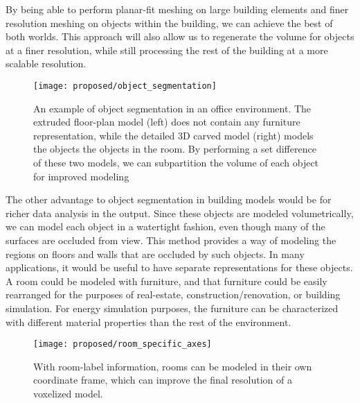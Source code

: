 \documentclass[journal]{IEEEtran}
\begin{document}
By being able to perform planar-fit meshing on large building elements and finer resolution meshing on objects within the building, we can achieve the best of both worlds.  This approach will also allow us to regenerate the volume for objects at a finer resolution, while still processing the rest of the building at a more scalable resolution.

\begin{figure}[t]
	\centerline{\texttt{[image: proposed/object\_segmentation]}}
	\caption{An example of object segmentation in an office environment.  The extruded floor-plan model (left) does not contain any furniture representation, while the detailed 3D carved model (right) models the objects the objects in the room.  By performing a set difference of these two models, we can subpartition the volume of each object for improved modeling}
	\label{fig:objectseg}
\end{figure}

The other advantage to object segmentation in building models would be for richer data analysis in the output.  Since these objects are modeled volumetrically, we can model each object in a watertight fashion, even though many of the surfaces are occluded from view.  This method provides a way of modeling the regions on floors and walls that are occluded by such objects.  In many applications, it would be useful to have separate representations for these objects.  A room could be modeled with furniture, and that furniture could be easily rearranged for the purposes of real-estate, construction/renovation, or building simulation.  For energy simulation purposes, the furniture can be characterized with different material properties than the rest of the environment.

\begin{figure}[t]
	\centerline{\texttt{[image: proposed/room\_specific\_axes]}}
	\caption{With room-label information, rooms can be modeled in their own coordinate frame, which can improve the final resolution of a voxelized model.}
	\label{fig:room_axes}
\end{figure}
\end{document}
